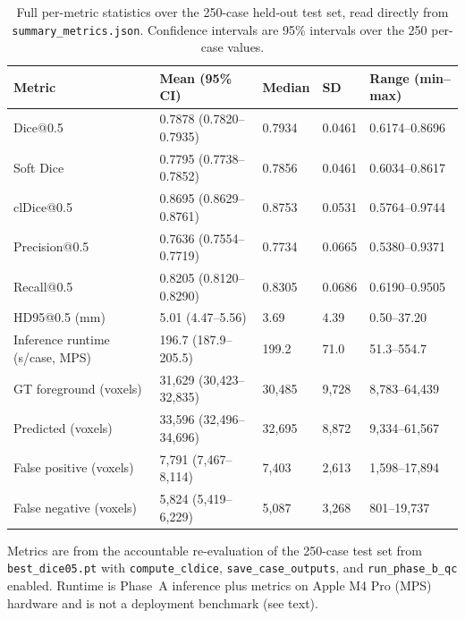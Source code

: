 \documentclass[anonymous]{iopjournal}
\begin{document}
\begin{table}[!t]
\centering
\caption{Full per-metric statistics over the 250-case held-out test set, read directly from \texttt{summary\_metrics.json}. Confidence intervals are 95\% intervals over the 250 per-case values.}
\label{tab:full-metrics}
\begin{threeparttable}
\footnotesize
\setlength{\tabcolsep}{5pt}
\begin{tabularx}{0.97\textwidth}{L{0.24\textwidth} l l l Y}
\toprule
\textbf{Metric} & \textbf{Mean (95\% CI)} & \textbf{Median} & \textbf{SD} & \textbf{Range (min--max)} \\
\midrule
Dice@0.5 & 0.7878 (0.7820--0.7935) & 0.7934 & 0.0461 & 0.6174--0.8696 \\
Soft Dice & 0.7795 (0.7738--0.7852) & 0.7856 & 0.0461 & 0.6034--0.8617 \\
clDice@0.5 & 0.8695 (0.8629--0.8761) & 0.8753 & 0.0531 & 0.5764--0.9744 \\
Precision@0.5 & 0.7636 (0.7554--0.7719) & 0.7734 & 0.0665 & 0.5380--0.9371 \\
Recall@0.5 & 0.8205 (0.8120--0.8290) & 0.8305 & 0.0686 & 0.6190--0.9505 \\
HD95@0.5 (mm) & 5.01 (4.47--5.56) & 3.69 & 4.39 & 0.50--37.20 \\
Inference runtime (s/case, MPS) & 196.7 (187.9--205.5) & 199.2 & 71.0 & 51.3--554.7 \\
\midrule
GT foreground (voxels) & 31,629 (30,423--32,835) & 30,485 & 9,728 & 8,783--64,439 \\
Predicted (voxels) & 33,596 (32,496--34,696) & 32,695 & 8,872 & 9,334--61,567 \\
False positive (voxels) & 7,791 (7,467--8,114) & 7,403 & 2,613 & 1,598--17,894 \\
False negative (voxels) & 5,824 (5,419--6,229) & 5,087 & 3,268 & 801--19,737 \\
\bottomrule
\end{tabularx}
\begin{tablenotes}\footnotesize
\item Metrics are from the accountable re-evaluation of the 250-case test set from \texttt{best\_dice05.pt} with \texttt{compute\_cldice}, \texttt{save\_case\_outputs}, and \texttt{run\_phase\_b\_qc} enabled. Runtime is Phase~A inference plus metrics on Apple M4 Pro (MPS) hardware and is not a deployment benchmark (see text).
\end{tablenotes}
\end{threeparttable}
\end{table}
\end{document}
